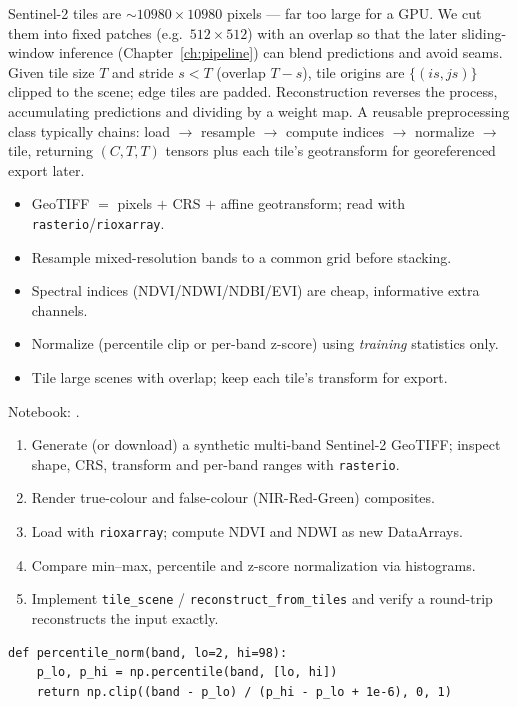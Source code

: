 Sentinel-2 tiles are $\sim$$10980\times10980$ pixels --- far too large for a GPU.
We cut them into fixed patches (e.g.\ $512\times512$) with an overlap so that the
later sliding-window inference (Chapter~\ref{ch:pipeline}) can blend predictions
and avoid seams. Given tile size $T$ and stride $s<T$ (overlap $T-s$), tile
origins are $\{(i s, j s)\}$ clipped to the scene; edge tiles are padded.
Reconstruction reverses the process, accumulating predictions and dividing by a
weight map. A reusable preprocessing class typically chains: load $\to$ resample
$\to$ compute indices $\to$ normalize $\to$ tile, returning $(C,T,T)$ tensors
plus each tile's geotransform for georeferenced export later.

\begin{keybox}
\begin{itemize}[leftmargin=1.2em,nosep]
  \item GeoTIFF $=$ pixels $+$ CRS $+$ affine geotransform; read with \texttt{rasterio}/\texttt{rioxarray}.
  \item Resample mixed-resolution bands to a common grid before stacking.
  \item Spectral indices (NDVI/NDWI/NDBI/EVI) are cheap, informative extra channels.
  \item Normalize (percentile clip or per-band z-score) using \emph{training} statistics only.
  \item Tile large scenes with overlap; keep each tile's transform for export.
\end{itemize}
\end{keybox}

\begin{practbox}
Notebook: .
\begin{enumerate}[leftmargin=1.4em,nosep]
  \item Generate (or download) a synthetic multi-band Sentinel-2 GeoTIFF; inspect
  shape, CRS, transform and per-band ranges with \texttt{rasterio}.
  \item Render true-colour and false-colour (NIR-Red-Green) composites.
  \item Load with \texttt{rioxarray}; compute NDVI and NDWI as new DataArrays.
  \item Compare min--max, percentile and z-score normalization via histograms.
  \item Implement \texttt{tile\_scene} / \texttt{reconstruct\_from\_tiles} and
  verify a round-trip reconstructs the input exactly.
\end{enumerate}
\begin{lstlisting}
def percentile_norm(band, lo=2, hi=98):
    p_lo, p_hi = np.percentile(band, [lo, hi])
    return np.clip((band - p_lo) / (p_hi - p_lo + 1e-6), 0, 1)
\end{lstlisting}
\end{practbox}

